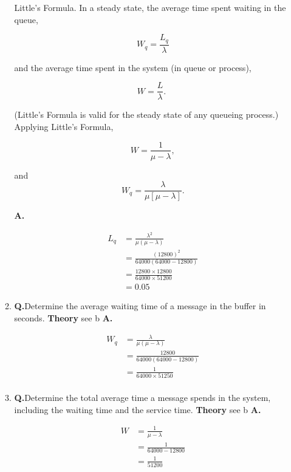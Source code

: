\documentclass[main.tex]{subfiles}
\begin{document}
\begin{enumerate}
\begin{enumerate}
        Little's Formula. In a steady state, the average time spent waiting in the queue,
        
        $$
        W_q=\frac{L_q}{\lambda}
        $$
        
        and the average time spent in the system (in queue or process),
        
        $$
        W=\frac{L}{\lambda} \text {. }
        $$
        
        (Little's Formula is valid for the steady state of any queueing process.) Applying Little's Formula,
        
        $$
        W=\frac{1}{\mu-\lambda},
        $$
        
        and
        $$
        W_q=\frac{\lambda}{\mu[\mu-\lambda]}.
        $$

        \textbf{A.}

        $$
        \begin{aligned}
        L_q & = \frac{\lambda^2}{\mu(\mu-\lambda)} \\
        & = \frac{(12800)^2}{64000(64000-12800)} \\
        & = \frac{12800 \times 12800}{64000 \times 51200} \\
        & = 0.05
        \end{aligned}
        $$
        
        \item \textbf{Q.}Determine the average waiting time of a message in the buffer in seconds. \textbf{Theory} see b \textbf{A.} 
        
        $$
        \begin{aligned}
        W_q & =\frac{\lambda}{\mu(\mu-\lambda)} \\
        & =\frac{12800}{64000(64000-12800)} \\
        & =\frac{1}{64000 \times 51250} \\
        \end{aligned}
        $$
        
        \item \textbf{Q.}Determine the total average time a message spends in the system, including the waiting time and the service time. \textbf{Theory} see b \textbf{A.} 
        
        $$
        \begin{aligned}
        W &= \frac{1}{\mu-\lambda}\\
        &= \frac{1}{64000-12800} \\
        &= \frac{1}{51200}
        \end{aligned}
        $$
        

\end{enumerate}
\end{enumerate}
\end{document}
